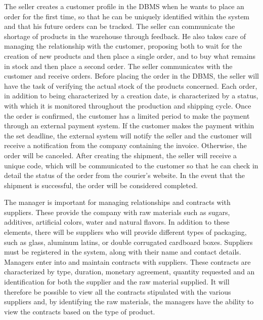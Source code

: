 The seller creates a customer profile in the DBMS when he wants to place an order for the first time, so that he can be uniquely identified within the system and that his future orders can be tracked. The seller can communicate the shortage of products in the warehouse through feedback. He also takes care of managing the relationship with the customer, proposing both to wait for the creation of new products and then place a single order, and to buy what remains in stock and then place a second order. The seller communicates with the customer and receive orders. Before placing the order in the DBMS, the seller will have the task of verifying the actual stock of the products concerned. Each order, in addition to being characterized by a creation date, is characterized by a status, with which it is monitored throughout the production and shipping cycle. Once the order is confirmed, the customer has a limited period to make the payment through an external payment system. If the customer makes the payment within the set deadline, the external system will notify the seller and the customer will receive a notification from the company containing the invoice. Otherwise, the order will be canceled. After creating the shipment, the seller will receive a unique code, which will be communicated to the customer so that he can check in detail the status of the order from the courier's website. In the event that the shipment is successful, the order will be considered completed.

The manager is important for managing relationships and contracts with suppliers. These provide the company with raw materials such as sugars, additives, artificial colors, water and natural flavors. In addition to these elements, there will be suppliers who will provide different types of packaging, such as glass, aluminum latins, or double corrugated cardboard boxes.
Suppliers must be registered in the system, along with their name and contact details. Managers enter into and maintain contracts with suppliers. These contracts are characterized by type, duration, monetary agreement, quantity requested and an identification for both the supplier and the raw material supplied.
It will therefore be possible to view all the contracts stipulated with the various suppliers and, by identifying the raw materials, the managers have the ability to view the contracts based on the type of product.

